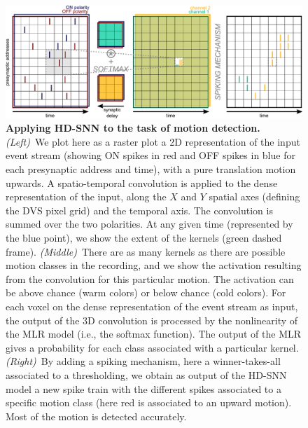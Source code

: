 \documentclass[default]{sn-jnl}%
\theoremstyle{thmstyleone}%
\theoremstyle{thmstyletwo}%
\theoremstyle{thmstylethree}%
\begin{document}
\begin{figure}%
    \centering
    \includegraphics[width=\linewidth]{figures/HDSNN_conv.pdf}
    \caption{
    \textbf{Applying HD-SNN to the task of motion detection.} \textit{(Left)}~We plot here as a raster plot a 2D representation of the input event stream (showing ON spikes in red and OFF spikes in blue for each presynaptic address and time), with a pure translation motion upwards. A spatio-temporal convolution is applied to the dense representation of the input, along the $X$ and $Y$ spatial axes (defining the DVS pixel grid) and the temporal axis. The convolution is summed over the two polarities. At any given time (represented by the blue point), we show the extent of the kernels (green dashed frame). \textit{(Middle)}~There are as many kernels as there are possible motion classes in the recording, and we show the activation resulting from the convolution for this particular motion. The activation can be above chance (warm colors) or below chance (cold colors). For each voxel on the dense representation of the event stream as input, the output of the 3D convolution is processed by the nonlinearity of the MLR model (i.e., the softmax function). The output of the MLR gives a probability for each class associated with a particular kernel. \textit{(Right)}~By adding a spiking mechanism, here a winner-takes-all associated to a thresholding, we obtain as output of the HD-SNN model a new spike train with the different spikes associated to a specific motion class (here red is associated to an upward motion). Most of the motion is detected accurately. }
    \label{fig:model}
\end{figure}
\end{document}
